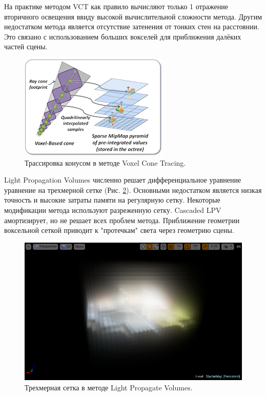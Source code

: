 \documentclass[oneside,final,12pt, a4paper]{extreport}
\begin{document}
На практике методом VCT как правило вычисляют только 1 отражение вторичного освещения ввиду высокой вычислительной сложности метода. Другим недостатком метода является отсутствие затенения от тонких стен на расстоянии. Это связано с использованием больших вокселей для приближения далёких частей сцены.

\begin{figure}[htb]
  \begin{center}
  \includegraphics[width=0.5 \linewidth]{img/VCT.png}
  \caption{Трассировка конусом в методе Voxel Cone Tracing.}
  \label{fig:VCT}
  \end{center}
\end{figure}

Light Propagation Volumes \cite{LPV} численно решает дифференциальное уравнение уравнение на трехмерной сетке (Рис. \ref{fig:LPV}). Основными недостатком является низкая точность и высокие затраты памяти на регулярную сетку. Некоторые модификации метода используют разреженную сетку. Cascaded LPV \cite{CascadedLPV} амортизирует, но не решает всех проблем метода. Приближение геометрии воксельной сеткой приводит к "протечкам" света через геометрию сцены.

\begin{figure}[htb]
  \begin{center}
  \includegraphics[width=0.8 \linewidth]{img/LPV.png}
  \caption{Трехмерная сетка в методе Light Propagate Volumes.}
  \label{fig:LPV}
  \end{center}
\end{figure}
\end{document}
